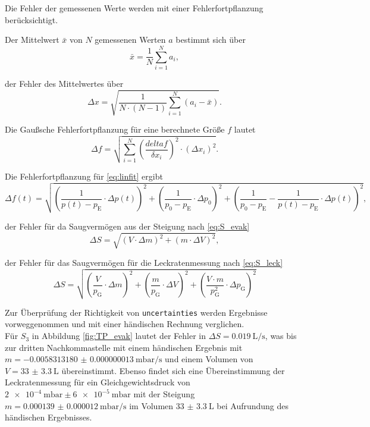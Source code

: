 Die Fehler der gemessenen Werte werden mit einer Fehlerfortpflanzung berücksichtigt. 

Der Mittelwert $\bar{x}$ von $N$ gemessenen Werten $a$ bestimmt sich über
\begin{equation}
    \bar{x} = \frac{1}{N} \sum^N_{i=1} a_i,
    \label{eq:mittelwerte}
\end{equation}

der Fehler des Mittelwertes über
\begin{equation}
    \Delta x = \sqrt{\frac{1}{N \cdot (N-1)} \sum^N_{i=1}(a_i - \bar{x})}.
    \label{eq:mittelwerte_fehler}
\end{equation}

Die Gaußsche Fehlerfortpflanzung für eine berechnete Größe $f$ lautet
\begin{equation}
    \Delta f = \sqrt{ \sum^N_{i=1} \left( \frac{delta f}{\delta x_i}\right)^2 \cdot (\Delta x_i)^2}.
\end{equation}

Die Fehlerfortpflanzung für \eqref{eq:linfit} ergibt
\begin{equation}
    \Delta f(t) = \sqrt{ \left(\frac{1}{p(t) - p_\text{E}} \cdot \Delta p(t)\right)^2 + \left(\frac{1}{p_0 - p_\text{E}} \cdot \Delta p_0\right)^2 + \left(\frac{1}{p_0 - p_\text{E}} - \frac{1}{p(t) - p_\text{E}} \cdot \Delta p(t)\right)^2  },
    \label{eq:fehler_f}
\end{equation}

der Fehler für da Saugvermögen aus der Steigung nach \eqref{eq:S_evak}
\begin{equation}
    \Delta S = \sqrt{ (V \cdot \Delta m)^2 + (m \cdot \Delta V)^2},
    \label{eq:fehler_S_evak}
\end{equation}

der Fehler für das Saugvermögen für die Leckratenmessung nach \eqref{eq:S_leck}
\begin{equation}
    \Delta S = \sqrt{ \left( \frac{V}{p_\text{G}} \cdot \Delta m \right)^2 + \left( \frac{m}{p_\text{G}} \cdot \Delta V \right)^2 + \left( \frac{V \cdot m}{p_\text{G}^2} \cdot \Delta p_\text{G} \right)^2 }
    \label{eq:fehler_S_leck}
\end{equation}

Zur Überprüfung der Richtigkeit von \texttt{uncertainties} werden Ergebnisse vorweggenommen und mit einer händischen Rechnung verglichen.\\
Für $S_3$ in Abbildung \ref{fig:TP_evak} lautet der Fehler in $\Delta S = \qty{0.019}{\liter\per\second}$, was bis zur dritten Nachkommastelle mit einem händischen Ergebnis mit
$m = \qty{-0.0058313180(130)}{\milli\bar\per\second}$ und einem Volumen von $V = \qty{33(3.3)}{\liter}$ übereinstimmt. Ebenso findet sich eine Übereinstimmung
der Leckratenmessung für ein Gleichgewichtsdruck von $\qty{2e-4}{\milli\bar} \pm \qty{6e-5}{\milli\bar}$ mit der Steigung $m = \qty{0.000139(12)}{\milli\bar\per\second}$ im Volumen $\qty{33(3.3)}{\liter}$ bei Aufrundung des händischen Ergebnisses.

